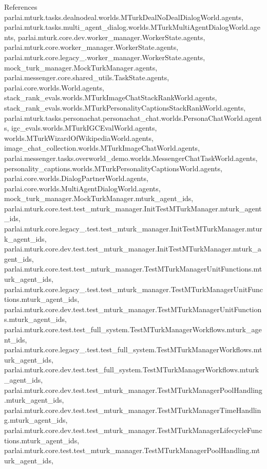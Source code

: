References parlai.\+mturk.\+tasks.\+dealnodeal.\+worlds.\+M\+Turk\+Deal\+No\+Deal\+Dialog\+World.\+agents, parlai.\+mturk.\+tasks.\+multi\+\_\+agent\+\_\+dialog.\+worlds.\+M\+Turk\+Multi\+Agent\+Dialog\+World.\+agents, parlai.\+mturk.\+core.\+dev.\+worker\+\_\+manager.\+Worker\+State.\+agents, parlai.\+mturk.\+core.\+worker\+\_\+manager.\+Worker\+State.\+agents, parlai.\+mturk.\+core.\+legacy\+\_.\+worker\+\_\+manager.\+Worker\+State.\+agents, mock\+\_\+turk\+\_\+manager.\+Mock\+Turk\+Manager.\+agents, parlai.\+messenger.\+core.\+shared\+\_\+utils.\+Task\+State.\+agents, parlai.\+core.\+worlds.\+World.\+agents, stack\+\_\+rank\+\_\+evals.\+worlds.\+M\+Turk\+Image\+Chat\+Stack\+Rank\+World.\+agents, stack\+\_\+rank\+\_\+evals.\+worlds.\+M\+Turk\+Personality\+Captions\+Stack\+Rank\+World.\+agents, parlai.\+mturk.\+tasks.\+personachat.\+personachat\+\_\+chat.\+worlds.\+Persona\+Chat\+World.\+agents, igc\+\_\+evals.\+worlds.\+M\+Turk\+I\+G\+C\+Eval\+World.\+agents, worlds.\+M\+Turk\+Wizard\+Of\+Wikipedia\+World.\+agents, image\+\_\+chat\+\_\+collection.\+worlds.\+M\+Turk\+Image\+Chat\+World.\+agents, parlai.\+messenger.\+tasks.\+overworld\+\_\+demo.\+worlds.\+Messenger\+Chat\+Task\+World.\+agents, personality\+\_\+captions.\+worlds.\+M\+Turk\+Personality\+Captions\+World.\+agents, parlai.\+core.\+worlds.\+Dialog\+Partner\+World.\+agents, parlai.\+core.\+worlds.\+Multi\+Agent\+Dialog\+World.\+agents, mock\+\_\+turk\+\_\+manager.\+Mock\+Turk\+Manager.\+mturk\+\_\+agent\+\_\+ids, parlai.\+mturk.\+core.\+test.\+test\+\_\+mturk\+\_\+manager.\+Init\+Test\+M\+Turk\+Manager.\+mturk\+\_\+agent\+\_\+ids, parlai.\+mturk.\+core.\+legacy\+\_.\+test.\+test\+\_\+mturk\+\_\+manager.\+Init\+Test\+M\+Turk\+Manager.\+mturk\+\_\+agent\+\_\+ids, parlai.\+mturk.\+core.\+dev.\+test.\+test\+\_\+mturk\+\_\+manager.\+Init\+Test\+M\+Turk\+Manager.\+mturk\+\_\+agent\+\_\+ids, parlai.\+mturk.\+core.\+test.\+test\+\_\+mturk\+\_\+manager.\+Test\+M\+Turk\+Manager\+Unit\+Functions.\+mturk\+\_\+agent\+\_\+ids, parlai.\+mturk.\+core.\+legacy\+\_.\+test.\+test\+\_\+mturk\+\_\+manager.\+Test\+M\+Turk\+Manager\+Unit\+Functions.\+mturk\+\_\+agent\+\_\+ids, parlai.\+mturk.\+core.\+dev.\+test.\+test\+\_\+mturk\+\_\+manager.\+Test\+M\+Turk\+Manager\+Unit\+Functions.\+mturk\+\_\+agent\+\_\+ids, parlai.\+mturk.\+core.\+test.\+test\+\_\+full\+\_\+system.\+Test\+M\+Turk\+Manager\+Workflows.\+mturk\+\_\+agent\+\_\+ids, parlai.\+mturk.\+core.\+legacy\+\_.\+test.\+test\+\_\+full\+\_\+system.\+Test\+M\+Turk\+Manager\+Workflows.\+mturk\+\_\+agent\+\_\+ids, parlai.\+mturk.\+core.\+dev.\+test.\+test\+\_\+full\+\_\+system.\+Test\+M\+Turk\+Manager\+Workflows.\+mturk\+\_\+agent\+\_\+ids, parlai.\+mturk.\+core.\+dev.\+test.\+test\+\_\+mturk\+\_\+manager.\+Test\+M\+Turk\+Manager\+Pool\+Handling.\+mturk\+\_\+agent\+\_\+ids, parlai.\+mturk.\+core.\+dev.\+test.\+test\+\_\+mturk\+\_\+manager.\+Test\+M\+Turk\+Manager\+Time\+Handling.\+mturk\+\_\+agent\+\_\+ids, parlai.\+mturk.\+core.\+dev.\+test.\+test\+\_\+mturk\+\_\+manager.\+Test\+M\+Turk\+Manager\+Lifecycle\+Functions.\+mturk\+\_\+agent\+\_\+ids, parlai.\+mturk.\+core.\+test.\+test\+\_\+mturk\+\_\+manager.\+Test\+M\+Turk\+Manager\+Pool\+Handling.\+mturk\+\_\+agent\+\_\+ids, 